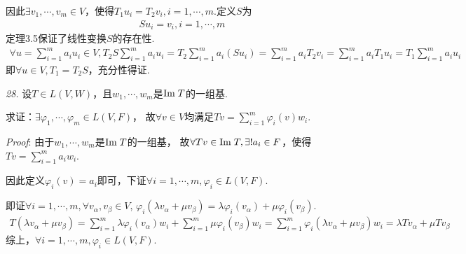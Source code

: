 因此\(\exists v_1,\cdots,v_m \in V\)，使得\(T_1u_i=T_2v_i,i=1,\cdots,m\).定义\(S\)为
    \begin{align*}
        Su_i=v_i,i=1,\cdots,m
    \end{align*}
定理3.5保证了线性变换\(S\)的存在性.
    \begin{align*}
        \forall u=\sum_{i=1}^m a_iu_i \in V,T_2S\sum_{i=1}^m a_iu_i=T_2\sum_{i=1}^m a_i(Su_i)
        =\sum_{i=1}^m a_iT_2v_i=\sum_{i=1}^m a_iT_1u_i=T_1\sum_{i=1}^m a_iu_i
    \end{align*}
即\(\forall u \in V , T_1=T_2S\)，充分性得证.

\hspace*{\fill}

    \begin{comment}
        \textit{26.}
        设\(D \in L(P(R))\)对于其中任意的多项式\(p\)满足\(\mydeg Dp=\mydeg p-1\).

        求证：\(D\)是满射变换.

        \textit{Proof}:
        根据\textit{3.B.10}，命题等价于
            \begin{align*}
                \myspan (D(x),D(x^2),\cdots)=\Img D=P(R)=\myspan (1,x,\cdots)
            \end{align*}
        根据\textit{2.C.10}，由于\(\mydeg Dp=\mydeg p-1\)，

        故\(\myspan (D(x),D(x^2),\cdots)=\myspan (1,x,\cdots)\)成立.
    \end{comment}

\textit{28.}
设\(T \in L(V,W)\)，且\(w_1,\cdots,w_m\)是\(\mathrm{Im \;} T\)的一组基.

求证：\(\exists \varphi_1,\cdots,\varphi_m \in L(V,F)\)，
故\(\forall v \in V\)均满足\(Tv=\sum_{i=1}^m{\varphi_i(v)w_i}\).

\textit{Proof}:
由于\(w_1,\cdots,w_m\)是\(\mathrm{Im \;} T\)的一组基，
故\(\forall Tv \in \mathrm{Im \;} T,\exists! a_i \in F\)，使得\(Tv=\sum_{i=1}^m a_iw_i\).

因此定义\(\varphi_i(v)=a_i\)即可，下证\(\forall i=1,\cdots,m,\varphi_i \in L(V,F)\).

即证\(\forall i=1,\cdots,m,\forall v_\alpha,v_\beta \in V\),
\(\varphi_i(\lambda v_\alpha+\mu v_\beta)=\lambda \varphi_i(v_\alpha)+\mu \varphi_i(v_\beta)\).
    \begin{align*}
        T(\lambda v_\alpha+\mu v_\beta)=\sum_{i=1}^m \lambda \varphi_i(v_\alpha)w_i+\sum_{i=1}^m \mu \varphi_i(v_\beta)w_i
        =\sum_{i=1}^m \varphi_i(\lambda v_\alpha+\mu v_\beta)w_i=\lambda Tv_\alpha+\mu Tv_\beta
    \end{align*}
综上，\(\forall i=1,\cdots,m,\varphi_i \in L(V,F)\).

